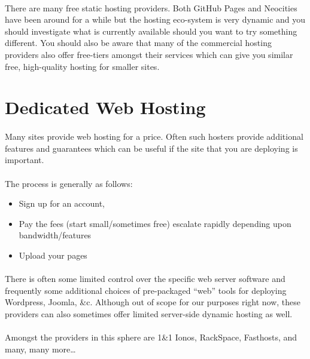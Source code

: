 \paragraph{} There are many free static hosting providers. Both GitHub Pages and Neocities have been around for a while but the hosting eco-system is very dynamic and you should investigate what is currently available should you want to try something different. You should also be aware that many of the commercial hosting providers also offer free-tiers amongst their services which can give you similar free, high-quality hosting for smaller sites.

\section{Dedicated Web Hosting}
\paragraph{} Many sites provide web hosting for a price. Often such hosters provide additional features and guarantees which can be useful if the site that you are deploying is important.
\paragraph{} The process is generally as follows:

\begin{itemize}
\item Sign up for an account, 
\item Pay the fees (start small/sometimes free) escalate rapidly depending upon bandwidth/features
\item Upload your pages
\end{itemize}

\paragraph{} There is often some limited control over the specific web server software and frequently some additional choices of pre-packaged “web” tools for deploying Wordpress, Joomla, \&c. Although out of scope for our purposes right now, these providers can also sometimes offer limited server-side dynamic hosting as well.

\paragraph{} Amongst the providers in this sphere are 1\&1 Ionos, RackSpace, Fasthosts, and many, many more…


